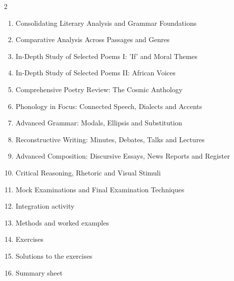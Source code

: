 \documentclass[11pt]{article}
\begin{document}
\begin{sommaire}
\begin{multicols}{2}
\begin{enumerate}
\item Consolidating Literary Analysis and Grammar Foundations
\item Comparative Analysis Across Passages and Genres
\item In-Depth Study of Selected Poems I: 'If' and Moral Themes
\item In-Depth Study of Selected Poems II: African Voices
\item Comprehensive Poetry Review: The Cosmic Anthology
\item Phonology in Focus: Connected Speech, Dialects and Accents
\item Advanced Grammar: Modals, Ellipsis and Substitution
\item Reconstructive Writing: Minutes, Debates, Talks and Lectures
\item Advanced Composition: Discursive Essays, News Reports and Register
\item Critical Reasoning, Rhetoric and Visual Stimuli
\item Mock Examinations and Final Examination Techniques
\item Integration activity
\item Methods and worked examples
\item Exercises
\item Solutions to the exercises
\item Summary sheet
\end{enumerate}
\end{multicols}
\end{sommaire}
\end{document}
